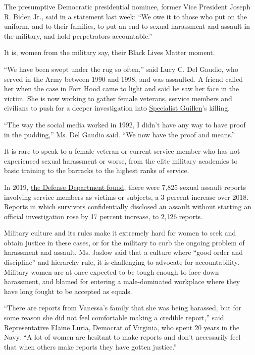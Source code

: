 The presumptive Democratic presidential nominee, former Vice President
Joseph R. Biden Jr., said in a statement last week: ``We owe it to those
who put on the uniform, and to their families, to put an end to sexual
harassment and assault in the military, and hold perpetrators
accountable.''

It is, women from the military say, their Black Lives Matter moment.

``We have been swept under the rug so often,'' said Lucy C. Del Gaudio,
who served in the Army between 1990 and 1998, and was assaulted. A
friend called her when the case in Fort Hood came to light and said he
saw her face in the victim. She is now working to gather female
veterans, service members and civilians to push for a deeper
investigation into
\href{https://twitter.com/rosemcgowan/status/1279466856479367175}{Specialist
Guillen}'s killing.

``The way the social media worked in 1992, I didn't have any way to have
proof in the pudding,'' Ms. Del Gaudio said. ``We now have the proof and
means.''

It is rare to speak to a female veteran or current service member who
has not experienced sexual harassment or worse, from the elite military
academies to basic training to the barracks to the highest ranks of
service.

In 2019,
\href{https://www.stripes.com/news/us/pentagon-reports-of-sexual-assault-harassment-in-the-military-have-increased-1.627966}{the
Defense Department found,} there were 7,825 sexual assault reports
involving service members as victims or subjects, a 3 percent increase
over 2018. Reports in which survivors confidentially disclosed an
assault without starting an official investigation rose by 17 percent
increase, to 2,126 reports.

Military culture and its rules make it extremely hard for women to seek
and obtain justice in these cases, or for the military to curb the
ongoing problem of harassment and assault. Ms. Jaslow said that a
culture where ``good order and discipline'' and hierarchy rule, it is
challenging to advocate for accountability. Military women are at once
expected to be tough enough to face down harassment, and blamed for
entering a male-dominated workplace where they have long fought to be
accepted as equals.

``There are reports from Vanessa's family that she was being harassed,
but for some reason she did not feel comfortable making a credible
report,'' said Representative Elaine Luria, Democrat of Virginia, who
spent 20 years in the Navy. ``A lot of women are hesitant to make
reports and don't necessarily feel that when others make reports they
have gotten justice.''

